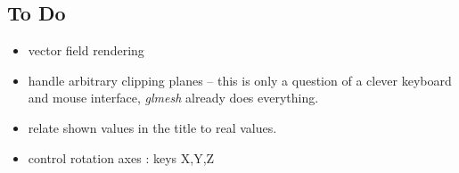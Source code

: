 \documentclass[a4paper]{article}
\begin{document}
\subsection{To Do}
\begin{itemize}
\item vector field rendering 
\item handle arbitrary clipping planes -- this is
only a question of a clever  keyboard and  mouse interface, 
{\em glmesh} already does everything.
\item relate shown values in the title to real values.
\item control rotation axes : keys X,Y,Z
\end{itemize}






\end{document}
